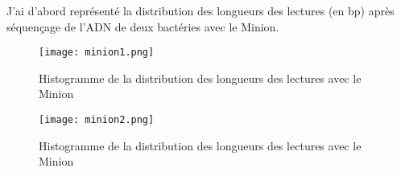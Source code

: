 \documentclass[11pt,a4paper]{article} %
\begin{document}
J'ai d'abord représenté la distribution des longueurs des lectures (en bp) après séquençage de l'ADN de deux bactéries avec le Minion.\\

\begin{figure}[h]
    \begin{minipage}[c]{.46\linewidth}
        \centering
        \texttt{[image: minion1.png]}
        \caption{\small Histogramme de la distribution des longueurs des lectures avec le Minion}
    \end{minipage}
    \hfill%
    \begin{minipage}[c]{.46\linewidth}
        \centering
        \texttt{[image: minion2.png]}
        \caption{\small Histogramme de la distribution des longueurs des lectures avec le Minion}
    \end{minipage}
\end{figure} 
\end{document}
